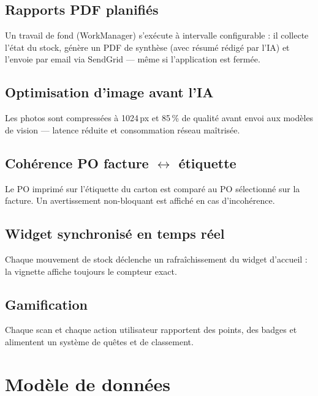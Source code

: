 \documentclass[11pt,a4paper]{article}
\begin{document}
\subsection{Rapports PDF planifiés}
Un travail de fond (WorkManager) s'exécute à intervalle
configurable : il collecte l'état du stock, génère un PDF de
synthèse (avec résumé rédigé par l'IA) et l'envoie par email via
SendGrid — même si l'application est fermée.

\subsection{Optimisation d'image avant l'IA}
Les photos sont compressées à 1024\,px et 85\,\% de qualité avant
envoi aux modèles de vision — latence réduite et consommation
réseau maîtrisée.

\subsection{Cohérence PO facture $\leftrightarrow$ étiquette}
Le PO imprimé sur l'étiquette du carton est comparé au PO sélectionné
sur la facture. Un avertissement non-bloquant est affiché en cas
d'incohérence.

\subsection{Widget synchronisé en temps réel}
Chaque mouvement de stock déclenche un rafraîchissement du widget
d'accueil : la vignette affiche toujours le compteur exact.

\subsection{Gamification}
Chaque scan et chaque action utilisateur rapportent des points, des
badges et alimentent un système de quêtes et de classement.

\section{Modèle de données}
\end{document}
